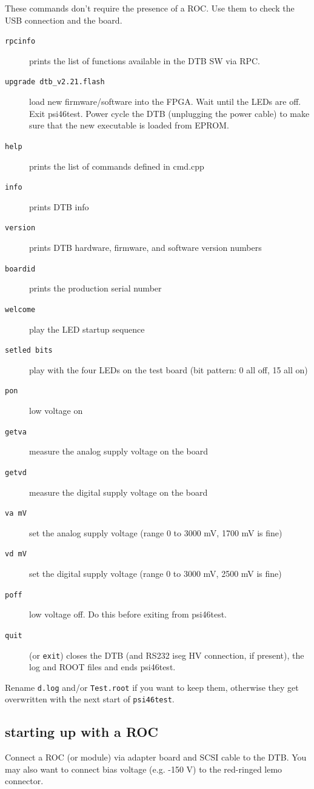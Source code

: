 \documentclass[english]{article}
\begin{document}
These commands don't require the presence of a ROC. Use them to check
the USB connection and the board. 
\begin{description}
\item [\texttt{rpcinfo}] prints the list of functions available
in the DTB SW via RPC. 
\item [\texttt{upgrade\ dtb\_v2.21.flash}] load new firmware/software
into the FPGA. Wait until the LEDs are off. Exit psi46test. Power
cycle the DTB (unplugging the power cable) to make sure that the new
executable is loaded from EPROM. 
\item [\texttt{help}] prints the list of commands defined in cmd.cpp 
\item [\texttt{info}] prints DTB info 
\item [\texttt{version}] prints DTB hardware, firmware, and software
version numbers 
\item [\texttt{boardid}] prints the production serial number 
\item [\texttt{welcome}] play the LED startup sequence 
\item [\texttt{setled\ bits}] play with the four LEDs on the
test board (bit pattern: 0 all off, 15 all on) 
\item [\texttt{pon}] low voltage on 
\item [\texttt{getva}] measure the analog supply voltage on the board 
\item [\texttt{getvd}] measure the digital supply voltage on the board 
\item [\texttt{va\ mV}] set the analog supply voltage (range
0 to 3000 mV, 1700 mV is fine) 
\item [\texttt{vd\ mV}] set the digital supply voltage (range
0 to 3000 mV, 2500 mV is fine) 
\item [\texttt{poff}] low voltage off. Do this before exiting
from psi46test. 
\item [\texttt{quit}] (or \texttt{exit}) closes the DTB (and
RS232 iseg HV connection, if present), the log and ROOT files and
ends psi46test. 
\end{description}
Rename \texttt{d.log} and/or \texttt{Test.root} if you want to keep
them, otherwise they get overwritten with the next start of \texttt{psi46test}.


\subsection{starting up with a ROC}

Connect a ROC (or module) via adapter board and SCSI cable to the
DTB. You may also want to connect bias voltage (e.g. -150 V) to the
red-ringed lemo connector.
\end{document}
